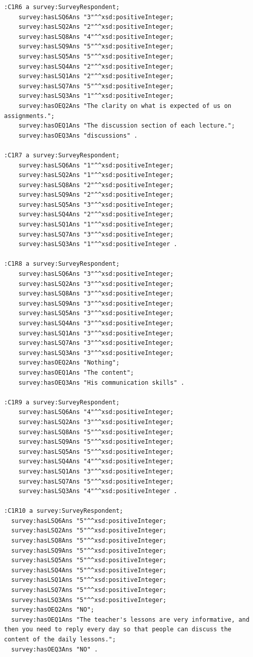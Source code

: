 \begin{lstlisting}
:C1R6 a survey:SurveyRespondent;
	survey:hasLSQ6Ans "3"^^xsd:positiveInteger;
	survey:hasLSQ2Ans "2"^^xsd:positiveInteger;
	survey:hasLSQ8Ans "4"^^xsd:positiveInteger;
	survey:hasLSQ9Ans "5"^^xsd:positiveInteger;
	survey:hasLSQ5Ans "5"^^xsd:positiveInteger;
	survey:hasLSQ4Ans "2"^^xsd:positiveInteger;
	survey:hasLSQ1Ans "2"^^xsd:positiveInteger;
	survey:hasLSQ7Ans "5"^^xsd:positiveInteger;
	survey:hasLSQ3Ans "1"^^xsd:positiveInteger;
	survey:hasOEQ2Ans "The clarity on what is expected of us on assignments.";
	survey:hasOEQ1Ans "The discussion section of each lecture.";
	survey:hasOEQ3Ans "discussions" .

:C1R7 a survey:SurveyRespondent;
	survey:hasLSQ6Ans "1"^^xsd:positiveInteger;
	survey:hasLSQ2Ans "1"^^xsd:positiveInteger;
	survey:hasLSQ8Ans "2"^^xsd:positiveInteger;
	survey:hasLSQ9Ans "2"^^xsd:positiveInteger;
	survey:hasLSQ5Ans "3"^^xsd:positiveInteger;
	survey:hasLSQ4Ans "2"^^xsd:positiveInteger;
	survey:hasLSQ1Ans "1"^^xsd:positiveInteger;
	survey:hasLSQ7Ans "3"^^xsd:positiveInteger;
	survey:hasLSQ3Ans "1"^^xsd:positiveInteger .

:C1R8 a survey:SurveyRespondent;
	survey:hasLSQ6Ans "3"^^xsd:positiveInteger;
	survey:hasLSQ2Ans "3"^^xsd:positiveInteger;
	survey:hasLSQ8Ans "3"^^xsd:positiveInteger;
	survey:hasLSQ9Ans "3"^^xsd:positiveInteger;
	survey:hasLSQ5Ans "3"^^xsd:positiveInteger;
	survey:hasLSQ4Ans "3"^^xsd:positiveInteger;
	survey:hasLSQ1Ans "3"^^xsd:positiveInteger;
	survey:hasLSQ7Ans "3"^^xsd:positiveInteger;
	survey:hasLSQ3Ans "3"^^xsd:positiveInteger;
	survey:hasOEQ2Ans "Nothing";
	survey:hasOEQ1Ans "The content";
	survey:hasOEQ3Ans "His communication skills" .

:C1R9 a survey:SurveyRespondent;
	survey:hasLSQ6Ans "4"^^xsd:positiveInteger;
	survey:hasLSQ2Ans "3"^^xsd:positiveInteger;
	survey:hasLSQ8Ans "5"^^xsd:positiveInteger;
	survey:hasLSQ9Ans "5"^^xsd:positiveInteger;
	survey:hasLSQ5Ans "5"^^xsd:positiveInteger;
	survey:hasLSQ4Ans "4"^^xsd:positiveInteger;
	survey:hasLSQ1Ans "3"^^xsd:positiveInteger;
	survey:hasLSQ7Ans "5"^^xsd:positiveInteger;
	survey:hasLSQ3Ans "4"^^xsd:positiveInteger .

:C1R10 a survey:SurveyRespondent;
  survey:hasLSQ6Ans "5"^^xsd:positiveInteger;
  survey:hasLSQ2Ans "5"^^xsd:positiveInteger;
  survey:hasLSQ8Ans "5"^^xsd:positiveInteger;
  survey:hasLSQ9Ans "5"^^xsd:positiveInteger;
  survey:hasLSQ5Ans "5"^^xsd:positiveInteger;
  survey:hasLSQ4Ans "5"^^xsd:positiveInteger;
  survey:hasLSQ1Ans "5"^^xsd:positiveInteger;
  survey:hasLSQ7Ans "5"^^xsd:positiveInteger;
  survey:hasLSQ3Ans "5"^^xsd:positiveInteger;
  survey:hasOEQ2Ans "NO";
  survey:hasOEQ1Ans "The teacher's lessons are very informative, and then you need to reply every day so that people can discuss the content of the daily lessons.";
  survey:hasOEQ3Ans "NO" .


\end{lstlisting}
